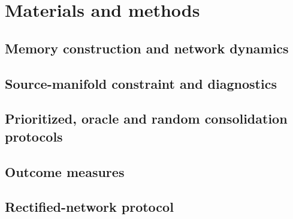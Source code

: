 \documentclass[10pt,letterpaper]{article}
\theoremstyle{plain}
\theoremstyle{remark}
\begin{document}
\section{Materials and methods}

\subsection{Memory construction and network dynamics}


\subsection{Source-manifold constraint and diagnostics}


\subsection{Prioritized, oracle and random consolidation protocols}


\subsection{Outcome measures}


\subsection{Rectified-network protocol}

\end{document}
